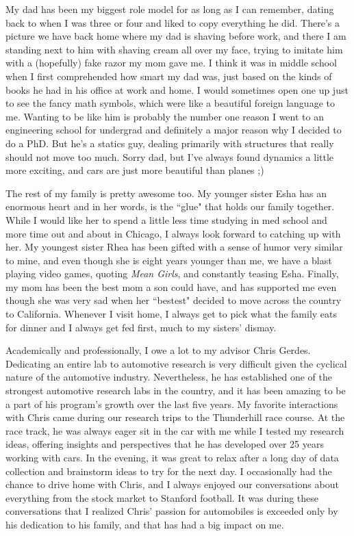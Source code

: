 
My dad has been my biggest role model for as long as I can remember,
dating back to when I was three or four and liked to copy everything he did. There's a picture we have back home where my dad is
shaving before work, and there I am standing next to him with shaving cream all over my face, trying to imitate him with a (hopefully) fake razor 
my mom gave me. I think it was in middle school when I first comprehended how smart my dad was, just based on the kinds of books
he had in his office at work and home. I would sometimes open one up just to see the fancy math symbols, which
were like a beautiful foreign language to me. Wanting to be like him is probably the number one reason I went to an engineering school
for undergrad and definitely a major reason why I decided to do a PhD. But he's a statics guy, dealing primarily with structures that really should
not move too much. Sorry dad, but I've always found dynamics a little more exciting, and cars are just more beautiful than planes ;)

The rest of my family is pretty awesome too. My younger sister Esha has an enormous heart and in her words, is the ``glue" that holds
our family together. While I would like her to spend a little less time studying in med school and more time out and about in Chicago,
I always look forward to catching up with her. My youngest sister Rhea has been gifted with a sense of humor very similar to mine, and even though
she is eight years younger than me, we have a blast playing video games, quoting \textit{Mean Girls}, and constantly teasing Esha. Finally, my mom has
been the best mom a son could have, and has supported me even though she was very sad when her ``bestest" decided to move across the country to California. Whenever I visit home, I always
get to pick what the family eats for dinner and I always get fed first, much to my sisters' dismay.

Academically and professionally, I owe a lot to my advisor Chris Gerdes. Dedicating an entire lab to automotive research is
 very difficult given the cyclical nature
of the automotive industry. Nevertheless, he has established one of the strongest automotive research labs in the
country, and it has been amazing to be a part of his program's growth over the last five years. My favorite interactions with Chris came during
our research trips to the Thunderhill race course. At the race track, he was always eager sit in the car with me while I tested my research ideas, offering
insights and perspectives that he has developed over 25 years working with cars. In the evening, it was great to relax after a long day of data
collection and brainstorm ideas to try for the next day. I occasionally had the chance to drive home with Chris, and I always enjoyed 
our conversations about everything from the stock market to Stanford football. It was during these conversations that I realized Chris' passion
for automobiles is exceeded only by his dedication to his family, and that has had a big impact on me. 

